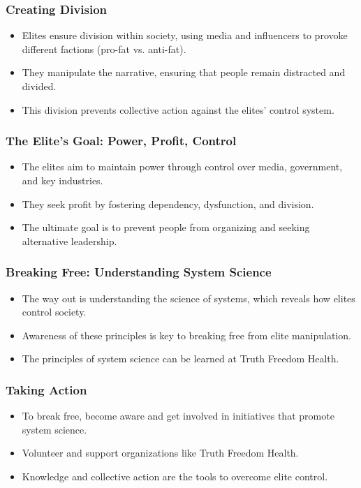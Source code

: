 \begin{frame}[fragile]\frametitle{Creating Division}
    \begin{itemize}
        \item Elites ensure division within society, using media and influencers to provoke different factions (pro-fat vs. anti-fat).
        \item They manipulate the narrative, ensuring that people remain distracted and divided.
        \item This division prevents collective action against the elites' control system.
    \end{itemize}
\end{frame}

\begin{frame}[fragile]\frametitle{The Elite's Goal: Power, Profit, Control}
    \begin{itemize}
        \item The elites aim to maintain power through control over media, government, and key industries.
        \item They seek profit by fostering dependency, dysfunction, and division.
        \item The ultimate goal is to prevent people from organizing and seeking alternative leadership.
    \end{itemize}
\end{frame}

\begin{frame}[fragile]\frametitle{Breaking Free: Understanding System Science}
    \begin{itemize}
        \item The way out is understanding the science of systems, which reveals how elites control society.
        \item Awareness of these principles is key to breaking free from elite manipulation.
        \item The principles of system science can be learned at Truth Freedom Health.
    \end{itemize}
\end{frame}

\begin{frame}[fragile]\frametitle{Taking Action}
    \begin{itemize}
        \item To break free, become aware and get involved in initiatives that promote system science.
        \item Volunteer and support organizations like Truth Freedom Health.
        \item Knowledge and collective action are the tools to overcome elite control.
    \end{itemize}
\end{frame}

